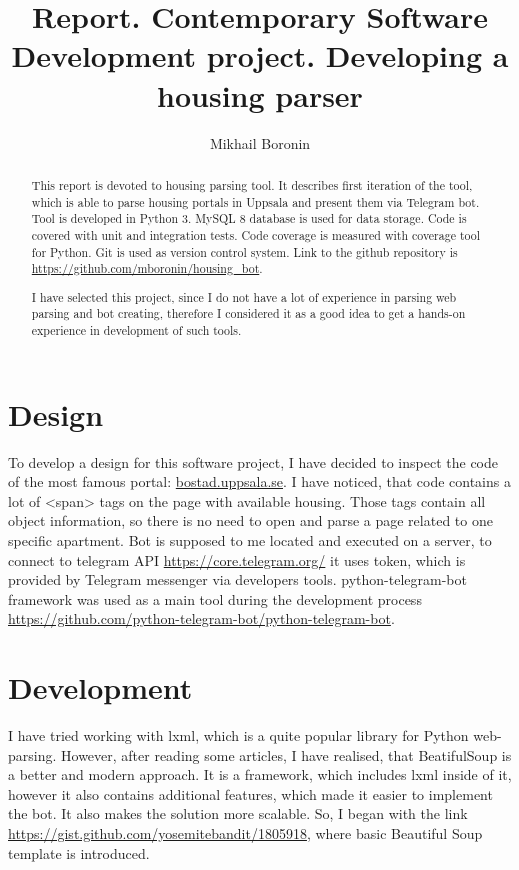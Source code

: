 \documentclass[a4paper,11pt]{article}
\title{Report. Contemporary Software Development project. Developing a housing parser}
\author{Mikhail Boronin}
\begin{document}
\maketitle
\tableofcontents

\begin{abstract}
This report is devoted to housing parsing tool. It describes first iteration of the tool, which is able to parse housing portals in Uppsala and present them via Telegram bot.
Tool is developed in Python 3. MySQL 8 database is used for data storage. 
Code is covered with unit and integration tests. Code coverage is measured with coverage tool for Python.
Git is used as version control system. Link to the github repository is \url{https://github.com/mboronin/housing_bot}.

I have selected this project, since I do not have a lot of experience in parsing web parsing and bot creating, therefore I considered it as a good idea to get a hands-on experience in development of such tools.
\end{abstract}

\section{Design}
To develop a design for this software project, I have decided to inspect the code of the most famous portal: \url{bostad.uppsala.se}. I have noticed, that code contains a lot of <span> tags on the page with available housing. Those tags contain all object information, so there is no need to open and parse a page related to one specific apartment.
Bot is supposed to me located and executed on a server, to connect to telegram API \url{https://core.telegram.org/} it uses token, which is provided by Telegram messenger via developers tools. python-telegram-bot framework was used as a main tool during the development process \url{https://github.com/python-telegram-bot/python-telegram-bot}. 

\section{Development}
I have tried working with lxml, which is a quite popular library for Python web-parsing.
However, after reading some articles, I have realised, that BeatifulSoup is a better and modern approach. It is a framework, which includes lxml inside of it, however it also contains additional features, which made it easier to implement the bot. It also makes the solution more scalable.
So, I began with the link \url{https://gist.github.com/yosemitebandit/1805918}, where basic Beautiful Soup template is introduced.
\end{document}
